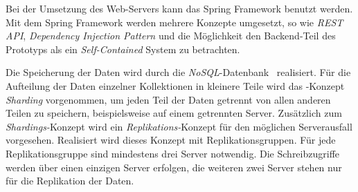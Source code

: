 Bei der Umsetzung des Web-Servers kann das Spring Framework benutzt werden. Mit dem Spring Framework werden mehrere Konzepte umgesetzt, so wie \textit{REST API}, \textit{Dependency Injection Pattern} und die Möglichkeit den Backend-Teil des Prototyps als ein \textit{Self-Contained} System zu betrachten.

Die Speicherung der Daten wird durch die \textit{NoSQL}-Datenbank \mongo\ realisiert. Für die Aufteilung der Daten einzelner Kollektionen in kleinere Teile wird das \mongo-Konzept \textit{Sharding} vorgenommen, um jeden Teil der Daten getrennt von allen anderen Teilen zu speichern, beispielsweise auf einem getrennten Server. Zusätzlich zum \textit{Shardings-}Konzept wird ein \textit{Replikations-}Konzept für den möglichen Serverausfall vorgesehen. Realisiert wird dieses Konzept mit Replikationsgruppen. Für jede Replikationsgruppe sind mindestens drei Server notwendig. Die Schreibzugriffe werden über einen einzigen Server erfolgen, die weiteren zwei Server stehen nur für die Replikation der Daten.
